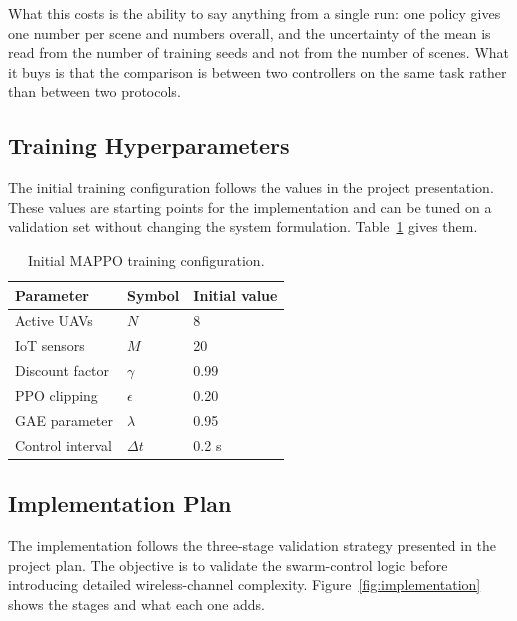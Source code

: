 \documentclass[conference]{IEEEtran}
\begin{document}
What this costs is the ability to say anything from a single run: one policy
gives one number per scene and \tokEgoShapeScenes{} numbers overall, and the
uncertainty of the mean is read from the number of training seeds and not from
the number of scenes.  What it buys is that the comparison is between two
controllers on the same task rather than between two protocols.



\subsection{Training Hyperparameters}
The initial training configuration follows the values in the project presentation. These values are starting points for the implementation and can be tuned on a validation set without changing the system formulation. Table~\ref{tab:hyper} gives them.

\begin{table}[t]
\caption{Initial MAPPO training configuration.}
\label{tab:hyper}
\centering
\scriptsize
\renewcommand{\arraystretch}{1.05}
\begin{tabular}{@{}lll@{}}
\toprule
Parameter & Symbol & Initial value \\
\midrule
Active UAVs & $N$ & 8 \\
IoT sensors & $M$ & 20 \\
Discount factor & $\gamma$ & 0.99 \\
PPO clipping & $\epsilon$ & 0.20 \\
GAE parameter & $\lambda$ & 0.95 \\
Control interval & $\Delta t$ & 0.2 s \\
\bottomrule
\end{tabular}
\end{table}

\subsection{Implementation Plan}
The implementation follows the three-stage validation strategy presented in the project plan. The objective is to validate the swarm-control logic before introducing detailed wireless-channel complexity. Figure~\ref{fig:implementation} shows the stages and what each one adds.
\end{document}
